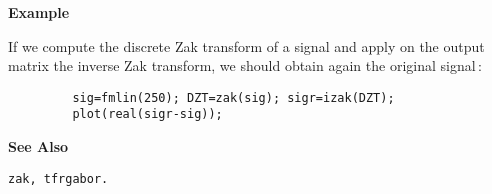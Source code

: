 {\bf \large \sf Example}\\
\hspace*{1.5cm}
\begin{minipage}[t]{13.5cm}
If we compute the discrete Zak transform of a signal and apply on the
output matrix the inverse Zak transform, we should obtain again the
original signal\,:
\begin{verbatim}
         sig=fmlin(250); DZT=zak(sig); sigr=izak(DZT);
         plot(real(sigr-sig));
\end{verbatim}
\end{minipage}
\vspace*{.5cm}


{\bf \large \sf See Also}\\
\hspace*{1.5cm}
\begin{minipage}[t]{13.5cm}
\begin{verbatim}
zak, tfrgabor.
\end{verbatim}
\end{minipage}

